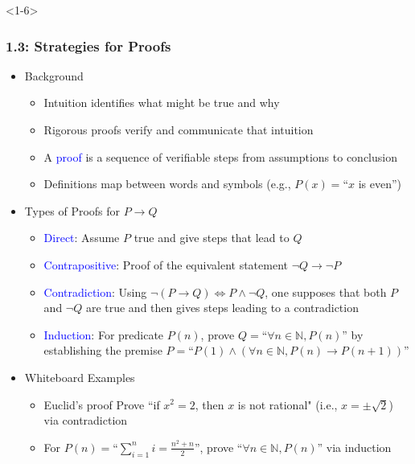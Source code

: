 \documentclass[10pt,english,aspectratio=169]{beamer}
\begin{document}
\begin{frame}<1-6> \frametitle{1.3: Strategies for Proofs}

\begin{itemize}
\setlength\itemsep{2.5mm}
\item<1-> Background \vspace{1mm}
\begin{itemize} 
 \setlength\itemsep{1.25mm}
 \item Intuition identifies what might be true and why
 \item Rigorous proofs verify and communicate that intuition
 \item A \textcolor{blue}{proof} is a sequence of verifiable steps from assumptions to conclusion
 \item Definitions map between words and symbols (e.g., $P(x)=$``$x$ is even'') 
\end{itemize}

\item<2-> Types of Proofs for $P \rightarrow Q$  \vspace{1mm}
\begin{itemize} 
 \setlength\itemsep{1.25mm}
 \item<2-> \textcolor{blue}{Direct}: Assume $P$ true and give steps that lead to $Q$
 \item<3-> \textcolor{blue}{Contrapositive}: Proof of the equivalent statement $\neg Q \rightarrow \neg P$
 \item<4-> \textcolor{blue}{Contradiction}: Using $\neg (P \rightarrow Q) \Leftrightarrow P \wedge \neg Q$, one supposes that both $P$ and $\neg Q$ are true and then gives steps leading to a contradiction
 \item<5-> \textcolor{blue}{Induction}: For predicate $P(n)$, prove $Q=$``$\forall n\in\mathbb{N}, P(n)$'' by establishing the premise $P=$``$P(1) \wedge (\forall n\in \mathbb{N}, P(n) \rightarrow P(n\!+\!1))$''
\end{itemize}

\item<6-> Whiteboard Examples \vspace{1mm}
\begin{itemize} 
 \setlength\itemsep{1.25mm}
 \item Euclid's proof Prove ``if $x^2 = 2$, then $x$ is not rational" (i.e., $x=\pm\sqrt{2}$) via contradiction
 \item For $P(n)=$``$\sum_{i=1}^n i = \frac{n^2 + n}{2}$'', prove ``$\forall n\in \mathbb{N}, P(n)$'' via induction
\end{itemize}
\end{itemize}


\end{frame}
\end{document}

